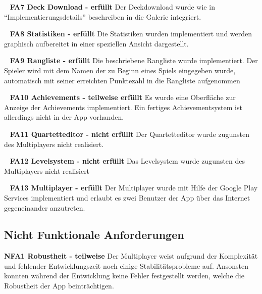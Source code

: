 \documentclass{scrartcl}
\begin{document}
\ \newline
\textbf{FA7 Deck Download - erfüllt} \newline
Der Deckdownload wurde wie in \enquote{Implementierungsdetails} beschreiben in
die Galerie integriert.

\ \newline
\textbf{FA8 Statistiken - erfüllt} \newline
Die Statistiken wurden implementiert und werden graphisch aufbereitet in einer
speziellen Ansicht dargestellt.

\ \newline
\textbf{FA9 Rangliste - erfüllt} \newline
Die beschriebene Rangliste wurde implementiert. Der Spieler wird mit dem Namen
der zu Beginn eines Spiels eingegeben wurde, automatisch mit seiner erreichten
Punktezahl in die Rangliste aufgenommen

\ \newline
\textbf{FA10 Achievements - teilweise erfüllt} \newline
Es wurde eine Oberfläche zur Anzeige der Achievements implementiert. Ein
fertiges Achievementsystem ist allerdings nicht in der App vorhanden.

\ \newline
\textbf{FA11 Quartetteditor - nicht erfüllt} \newline
Der Quartetteditor wurde zugunsten des Multiplayers nicht realisiert.

\ \newline
\textbf{FA12 Levelsystem - nicht erfüllt} \newline
Das Levelsystem wurde zugunsten des Multiplayers nicht realisiert

\ \newline
\textbf{FA13 Multiplayer - erfüllt} \newline
Der Multiplayer wurde mit Hilfe der Google Play Services implementiert und
erlaubt es zwei Benutzer der App über das Internet gegeneinander anzutreten.

\subsection{Nicht Funktionale Anforderungen}

\textbf{NFA1 Robustheit - teilweise} \newline
Der Multiplayer weist aufgrund der Komplexität und fehlender Entwicklungszeit
noch einige Stabilitätsprobleme auf. Ansonsten konnten während der Entwicklung
keine Fehler festgestellt werden, welche die Robustheit der App beinträchtigen.
\end{document}
